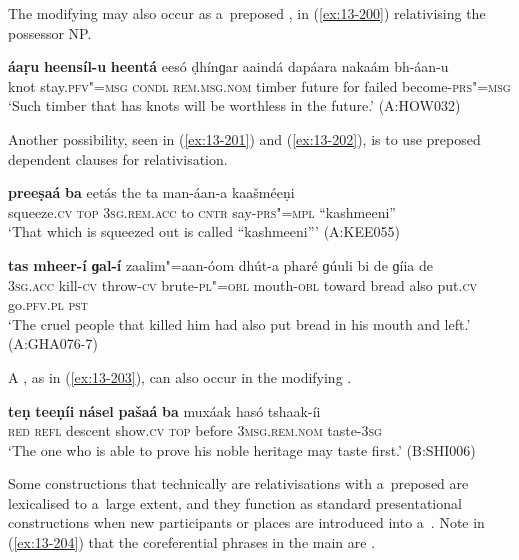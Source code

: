 The modifying  may also occur as a~preposed  , in (\ref{ex:13-200}) relativising the possessor NP.

\ea
\label{ex:13-200}
\gll \textbf{áaṛu} \textbf{heensíl-u} \textbf{heentá} eesó ḍhínɡar aaindá  dapáara nakaám bh-áan-u  \\
knot stay.\textsc{pfv"=msg} \textsc{condl} \textsc{rem.msg.nom} timber future  for failed become-\textsc{prs"=msg} \\
\glt `Such timber that has knots will be worthless in the future.' (A:HOW032) 
\z

Another possibility, seen in (\ref{ex:13-201}) and (\ref{ex:13-202}), is to use preposed dependent  clauses for relativisation.

\begin{exe}
\ex
\label{ex:13-201}
\gll \textbf{preeṣaá} \textbf{ba} eetás the ta man-áan-a kaašméeṇi \\
squeeze.\textsc{cv} \textsc{top} \textsc{3sg.rem.acc} to \textsc{cntr} say-\textsc{prs"=mpl} ``kashmeeni'' \\
\glt `That which is squeezed out is called ``kashmeeni''' (A:KEE055)

\ex
\label{ex:13-202}
\gll \textbf{tas} \textbf{mheer-í} \textbf{ɡal-í} zaalim"=aan-óom dhút-a  pharé ɡúuli bi de ɡíia de \\
\textsc{3sg.acc} kill-\textsc{cv} throw-\textsc{cv} brute-\textsc{pl"=obl} mouth-\textsc{obl}  toward bread also put.\textsc{cv} go.\textsc{pfv.pl} \textsc{pst} \\
\glt `The cruel people that killed him had also put bread in his mouth and left.' (A:GHA076-7) 
\end{exe}

A , as in (\ref{ex:13-203}), can also occur in the modifying . 

\begin{exe}
\ex
\label{ex:13-203}
\gll \textbf{teṇ} \textbf{teeṇíi} \textbf{násel} \textbf{pašaá} \textbf{ba} muxáak hasó  tshaak-íi \\
\textsc{red} \textsc{refl} descent show.\textsc{cv} \textsc{top} before \textsc{3msg.rem.nom}  taste-\textsc{3sg} \\
\glt `The one who is able to prove his noble heritage may taste first.' (B:SHI006) 
\end{exe}

Some constructions that technically are relativisations with a~preposed   are lexicalised to a~large extent, and they function as standard presentational constructions when new participants or places are introduced into a~. Note in (\ref{ex:13-204}) that the coreferential  phrases in the main  are .


